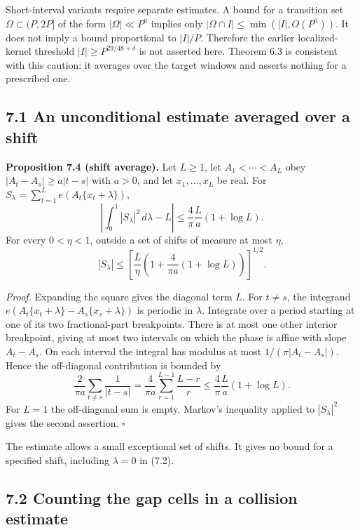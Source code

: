 \documentclass[11pt,a4paper]{article}
\begin{document}
Short-interval variants require separate estimates. A bound for a
transition set \(\Omega\subset(P,2P]\) of the form \(|\Omega|\ll P^a\)
implies only \(|\Omega\cap I|\le\min(|I|,O(P^a))\). It does not imply a
bound proportional to \(|I|/P\). Therefore the earlier localized-kernel
threshold \(|I|\ge P^{29/48+\delta}\) is not asserted here. Theorem 6.3
is consistent with this caution: it averages over the target windows and
asserts nothing for a prescribed one.


\subsection{7.1 An unconditional estimate averaged over a
shift}\label{an-unconditional-estimate-averaged-over-a-shift}

\textbf{Proposition 7.4 (shift average).} Let \(L\ge1\), let
\(A_1<\cdots<A_L\) obey \(|A_t-A_s|\ge a|t-s|\) with \(a>0\), and let
\(x_1,\ldots,x_L\) be real. For
\(S_\lambda=\sum_{t=1}^{L}e(A_t\{x_t+\lambda\})\), \[
\left|\int_0^1|S_\lambda|^2\,d\lambda-L\right|
\le\frac4\pi\frac La(1+\log L).
\tag{7.3}
\] For every \(0<\eta<1\), outside a set of shifts of measure at most
\(\eta\), \[
|S_\lambda|\le
\left[\frac L\eta\left(1+\frac4{\pi a}(1+\log L)\right)\right]^{1/2}.
\]

\emph{Proof.} Expanding the square gives the diagonal term \(L\). For
\(t\ne s\), the integrand \(e(A_t\{x_t+\lambda\}-A_s\{x_s+\lambda\})\)
is periodic in \(\lambda\). Integrate over a period starting at one of
its two fractional-part breakpoints. There is at most one other interior
breakpoint, giving at most two intervals on which the phase is affine
with slope \(A_t-A_s\). On each interval the integral has modulus at
most \(1/(\pi|A_t-A_s|)\). Hence the off-diagonal contribution is
bounded by \[
\frac{2}{\pi a}\sum_{t\ne s}\frac1{|t-s|}
=\frac4{\pi a}\sum_{r=1}^{L-1}\frac{L-r}{r}
\le\frac4\pi\frac La(1+\log L).
\] For \(L=1\) the off-diagonal sum is empty. Markov's inequality
applied to \(|S_\lambda|^2\) gives the second assertion. \(\square\)

The estimate allows a small exceptional set of shifts. It gives no bound
for a specified shift, including \(\lambda=0\) in (7.2).

\subsection{7.2 Counting the gap cells in a collision
estimate}\label{counting-the-gap-cells-in-a-collision-estimate}
\end{document}
